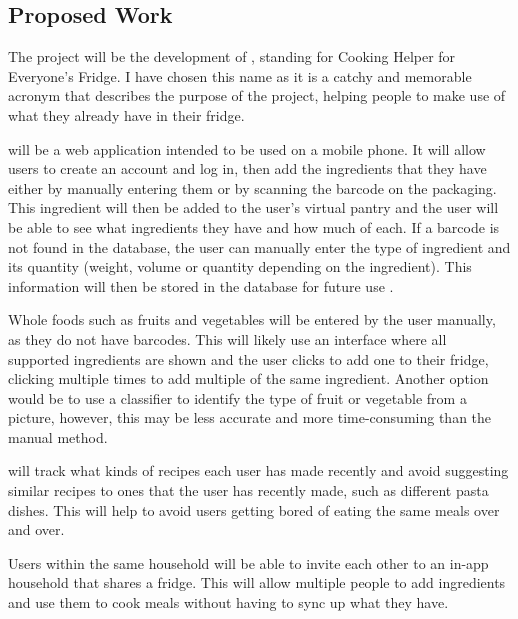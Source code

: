 \documentclass[../CHEFCookingHelperForEveryonesFridge.tex]{subfiles}
\begin{document}


\subsection{Proposed Work}

The project will be the development of \chef{}, standing for Cooking Helper for Everyone's Fridge. I have chosen this name
as it is a catchy and memorable acronym that describes the purpose of the project, helping people to make use of
what they already have in their fridge.

\chef{} will be a web application intended to be used on a mobile phone. It will allow users to create an account and log in,
then add the ingredients that they have either by manually entering them or by scanning the barcode on the packaging.
This ingredient will then be added to the user's virtual pantry and the user will be able to see what ingredients they have and how much of each.
If a barcode is not found in the database, the user can manually enter the type of ingredient and its quantity (weight, volume or quantity depending on the ingredient).
This information will then be stored in the database for future use .

Whole foods such as fruits and vegetables will be entered by the user manually, as they do not have barcodes. This will likely use an interface where
all supported ingredients are shown and the user clicks to add one to their fridge, clicking multiple times to add multiple of the same ingredient.
Another option would be to use a classifier to identify the type of fruit or vegetable from a picture, however, this may be less accurate and more
time-consuming than the manual method.

\chef{} will track what kinds of recipes each user has made recently and avoid suggesting similar recipes
to ones that the user has recently made, such as different pasta dishes. This will help to avoid users
getting bored of eating the same meals over and over.

Users within the same household will be able to invite each other to an in-app household that shares a fridge.
This will allow multiple people to add ingredients and use them to cook meals without having to sync up
what they have.
\end{document}
